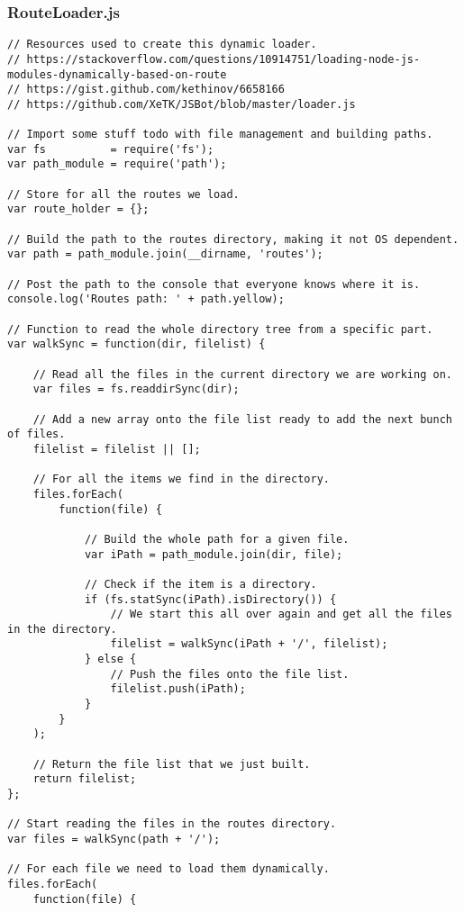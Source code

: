 \subsubsection*{RouteLoader.js}

\lstjavascript
\begin{lstlisting}
// Resources used to create this dynamic loader.
// https://stackoverflow.com/questions/10914751/loading-node-js-modules-dynamically-based-on-route
// https://gist.github.com/kethinov/6658166
// https://github.com/XeTK/JSBot/blob/master/loader.js

// Import some stuff todo with file management and building paths.
var fs          = require('fs');
var path_module = require('path');

// Store for all the routes we load.
var route_holder = {};

// Build the path to the routes directory, making it not OS dependent.
var path = path_module.join(__dirname, 'routes');

// Post the path to the console that everyone knows where it is.
console.log('Routes path: ' + path.yellow);

// Function to read the whole directory tree from a specific part.
var walkSync = function(dir, filelist) {

    // Read all the files in the current directory we are working on.
    var files = fs.readdirSync(dir);

    // Add a new array onto the file list ready to add the next bunch of files.
    filelist = filelist || [];

    // For all the items we find in the directory.
    files.forEach(
        function(file) {

            // Build the whole path for a given file.
            var iPath = path_module.join(dir, file);

            // Check if the item is a directory.
            if (fs.statSync(iPath).isDirectory()) {
                // We start this all over again and get all the files in the directory.
                filelist = walkSync(iPath + '/', filelist);
            } else {
                // Push the files onto the file list.
                filelist.push(iPath);
            }
        }
    );

    // Return the file list that we just built.
    return filelist;
}; 

// Start reading the files in the routes directory.
var files = walkSync(path + '/');

// For each file we need to load them dynamically.
files.forEach(
    function(file) {
        

\end{lstlisting}
